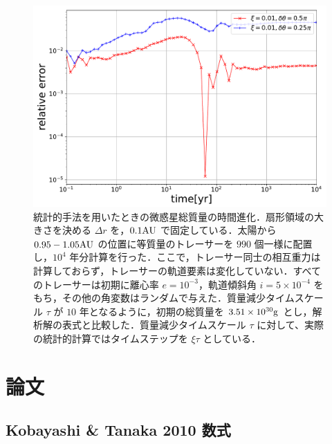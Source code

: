 \documentclass[11pt,a4paper,oneside,onecolumn]{jreport}
\begin{document}
\begin{figure}[H]
 \centering
 \includegraphics[width=12cm]{./image/MassDepletion_relative_error_05pi025pi.pdf}
 \caption{統計的手法を用いたときの微惑星総質量の時間進化．扇形領域の大きさを決める $\Delta r$ を，$0.1 {\rm AU}$ で固定している．太陽から $0.95 - 1.05 {\rm AU}$ の位置に等質量のトレーサーを $990$ 個一様に配置し，$10^4$ 年分計算を行った．ここで，トレーサー同士の相互重力は計算しておらず，トレーサーの軌道要素は変化していない．すべてのトレーサーは初期に離心率 $e = 10^{-3}$，軌道傾斜角 $i = 5 \times 10^{-4}$ をもち，その他の角変数はランダムで与えた．質量減少タイムスケール $\tau$ が $10$ 年となるように，初期の総質量を $3.51 \times 10^{30} {\rm g}$ とし，解析解の表式\cite{3}と比較した．質量減少タイムスケール $\tau$ に対して、実際の統計的計算ではタイムステップを $\xi \tau$ としている．\label{}}
\end{figure}







\appendix
\chapter{論文}

\section{Kobayashi \& Tanaka 2010 数式}
\end{document}

